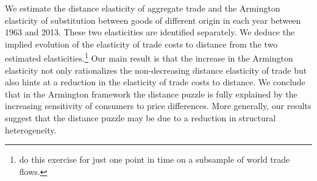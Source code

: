 \documentclass[12pt,twoside,a4paper,notitlepage]{article}
\begin{document}
We estimate the distance elasticity of aggregate trade and the Armington elasticity of substitution between goods of different origin in each year between 1963 and 2013.
These two elasticities are identified separately.
We deduce the implied evolution of the elasticity of trade costs to distance from the two estimated elasticities.\footnote{\cite{Erkel-Rousse2002} do this exercise for just one point in time on a subsample of world trade flows.}
Our main result is that the increase in the Armington elasticity not only rationalizes the non-decreasing distance elasticity of trade but also hints at a reduction in the elasticity of trade costs to distance.
We conclude that in the Armington framework the distance puzzle is fully explained by the increasing sensitivity of consumers to price differences.
More generally, our results suggest that the distance puzzle may be due to a reduction in structural heterogeneity.
\end{document}
